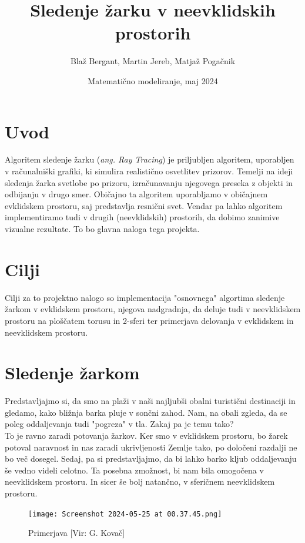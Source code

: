 \documentclass[titlepage]{article}
\title{Sledenje žarku v neevklidskih prostorih}
\author{Blaž Bergant, Martin Jereb, Matjaž Pogačnik}
\date{Matematično modeliranje, maj 2024}
\begin{document}

\maketitle
\newpage
\tableofcontents
\newpage


\section{Uvod}
Algoritem sledenje žarku (\textit{ang. Ray Tracing}) je priljubljen algoritem, uporabljen v računalniški grafiki, ki simulira realistično osvetlitev prizorov. Temelji na ideji sledenja žarka svetlobe po prizoru, izračunavanju njegovega preseka z objekti in odbijanju v drugo smer. Običajno ta algoritem uporabljamo v običajnem evklidskem prostoru, saj predstavlja resnični svet. Vendar pa lahko algoritem implementiramo tudi v drugih (neevklidskih) prostorih, da dobimo zanimive vizualne rezultate. To bo glavna naloga tega projekta.

\section{Cilji}
Cilji za to projektno nalogo so implementacija "osnovnega" algortima sledenje žarkom v evklidskem prostoru, njegova nadgradnja, da deluje tudi v neevklidskem prostoru na ploščatem torusu in 2-sferi ter primerjava delovanja v evklidskem in neevklidskem prostoru.

\section{Sledenje žarkom}

Predstavljajmo si, da smo na plaži v naši najljubši obalni turistični destinaciji in gledamo, kako bližnja barka pluje v sončni zahod. Nam, na obali zgleda, da se poleg oddaljevanja tudi "pogreza" v tla. Zakaj pa je temu tako? \\

To je ravno zaradi potovanja žarkov. Ker smo v evklidskem prostoru, bo žarek potoval naravnost in nas zaradi ukrivljenosti Zemlje tako, po določeni razdalji ne bo več dosegel. Sedaj, pa si predstavljajmo, da bi lahko barko kljub oddaljevanju še vedno videli celotno. Ta posebna zmožnost, bi nam bila omogočena v neevklidskem prostoru. In sicer še bolj natančno, v sferičnem neevklidskem prostoru.\\

\begin{figure}
    \centering
    \texttt{[image: Screenshot 2024-05-25 at 00.37.45.png]}
    \caption{Primerjava [Vir: G. Kovač]}
    \label{Slika:Primerjava}
\end{figure}
\end{document}
